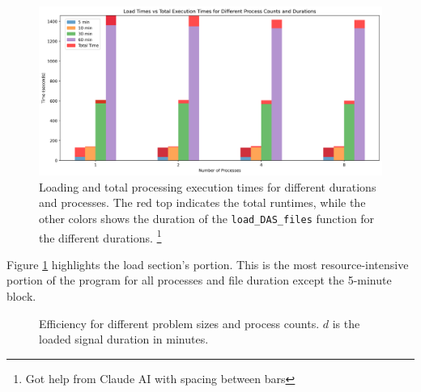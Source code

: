 \begin{figure}[!h]
    \centering
    \includegraphics[scale=0.50]{figures/judasex.png}
    \caption{Loading and total processing execution times for different durations and processes. The red top indicates the total runtimes, while the other colors shows the duration of the \lstinline{load_DAS_files} function for the different durations. \footnote{Got help from Claude AI with spacing between bars}}
    \label{fig:judasextime}
\end{figure}

Figure \ref{fig:judasextime} highlights the load section's portion. This is the most resource-intensive portion of the program for all processes and file duration except the 5-minute block. 


\begin{figure}[!htbp]
\centering
{}
\caption{Efficiency for different problem sizes and process counts. $d$ is the loaded signal duration in minutes.}
\label{fig:judasefficiency}
\end{figure}

